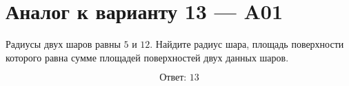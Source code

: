 \documentclass[12pt,a4paper]{article}
\begin{document}
\section*{Аналог к варианту 13 — A01}

Радиусы двух шаров равны \(5\) и \(12\). Найдите радиус шара, площадь поверхности которого равна сумме площадей поверхностей двух данных шаров.

\begin{center}
\end{center}

\[
\boxed{\text{Ответ: }13}
\]
\end{document}
